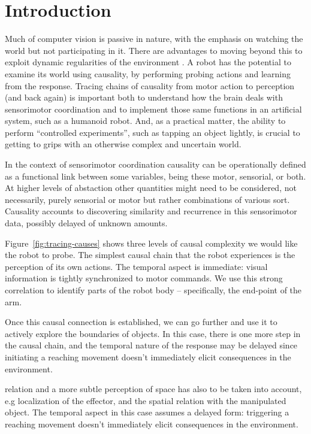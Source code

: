 

\section{Introduction}

\label{sect:introduction}

Much of computer vision is passive in nature, with the emphasis on
watching the world but not participating in it.  There are advantages
to moving beyond this to exploit dynamic regularities of the
environment \cite{ballard91animate,breazeal00social}.  A robot has the
potential to examine its world using causality, by performing probing
actions and learning from the response.  Tracing chains of causality
from motor action to perception (and back again) is important both to
understand how the brain deals with sensorimotor coordination and to
implement those same functions in an artificial system, such as a
humanoid robot.  And, as a practical matter, the ability to perform
``controlled experiments'', such as tapping an object lightly, is
crucial to getting to grips with an otherwise complex and uncertain
world.

\ifverbose
In the context of sensorimotor coordination causality can be operationally
defined as a functional link between some variables, being these motor,
sensorial, or both.  At higher levels of abstaction other quantities might
need to be considered, not necessarily, purely sensorial or motor but
rather combinations of various sort. Causality accounts to discovering
similarity and recurrence in this sensorimotor data, possibly delayed of
unknown amounts.
\fi


Figure~\ref{fig:tracing-causes} shows three levels of causal complexity
we would like the robot to probe.
The simplest causal chain that the robot experiences is the
perception of its own actions.  The temporal aspect is immediate:
visual information is tightly synchronized to motor commands.
We use this strong correlation to identify parts of the robot
body -- specifically, the end-point of the arm. 

Once this causal connection is established, we can go further and use
it to actively explore the boundaries of objects.  In this case, there
is one more step in the causal chain, and the temporal nature of
the response may be delayed since initiating a reaching movement doesn't
immediately elicit consequences in the environment.  

\ifverbose
relation and a
more subtle perception of space has also to be taken into account, e.g
localization of the effector, and the spatial relation with the
manipulated object.  The temporal aspect in this case assumes a
delayed form: triggering a reaching movement doesn't immediately
elicit consequences in the environment.

